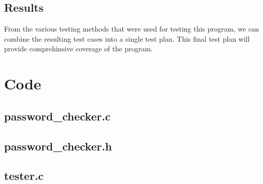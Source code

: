 \documentclass[12pt,letterpaper]{article}
\begin{document}
\subsection{Results}

From the various testing methods that were used for testing this program,
we can combine the resulting test cases into a single test plan. This final
test plan will provide comprehinsive coverage of the program.




\section{Code}

\subsection{password\_checker.c}




\subsection{password\_checker.h}



\subsection{tester.c}


\end{document}
